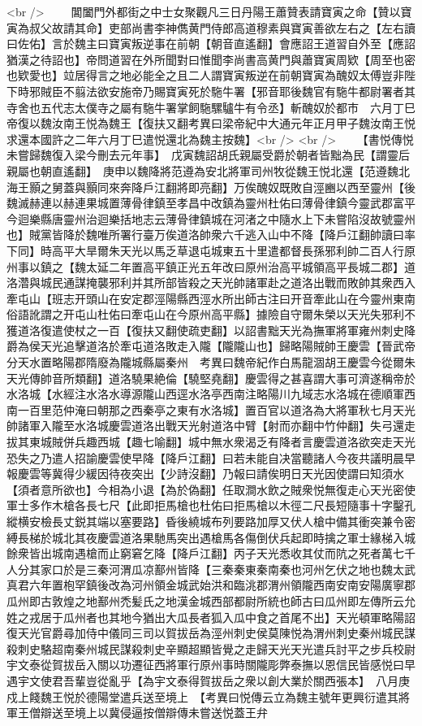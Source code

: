 <br />
　　閶闔門外都街之中士女聚觀凡三日丹陽王蕭贊表請寶寅之命【贊以寶寅為叔父故請其命】吏部尚書李神儁黄門侍郎高道穆素與寶寅善欲左右之【左右讀曰佐佑】言於魏主曰寶寅叛逆事在前朝【朝音直遙翻】會應詔王道習自外至【應詔猶漢之待詔也】帝問道習在外所聞對曰惟聞李尚書高黄門與蕭寶寅周欵【周至也密也欵愛也】竝居得言之地必能全之且二人謂寶寅叛逆在前朝寶寅為醜奴太傅豈非陛下時邪賊臣不翦法欲安施帝乃賜寶寅死於駞牛署【邪音耶後魏官有駞牛都尉署者其寺舍也五代志太僕寺之屬有駞牛署掌飼駞騾驢牛有令丞】斬醜奴於都市　六月丁巳帝復以魏汝南王悦為魏王【復扶又翻考異曰梁帝紀中大通元年正月甲子魏汝南王悦求還本國許之二年六月丁巳遣悦還北為魏主按魏】<br />
<br />
　　【書悦傳悦未嘗歸魏復入梁今刪去元年事】　戊寅魏詔胡氏親屬受爵於朝者皆黜為民【謂靈后親屬也朝直遙翻】　庚申以魏降將范遵為安北將軍司州牧從魏王悦北還【范遵魏北海王顥之舅蓋與顥同來奔降戶江翻將即亮翻】万俟醜奴既敗自涇豳以西至靈州【後魏滅赫連以赫連果城置薄骨律鎮至孝昌中改鎮為靈州杜佑曰薄骨律鎮今靈武郡富平今迴樂縣唐靈州治迴樂括地志云薄骨律鎮城在河渚之中隨水上下未嘗陷沒故號靈州也】賊黨皆降於魏唯所署行臺万俟道洛帥衆六千逃入山中不降【降戶江翻帥讀曰率下同】時高平大旱爾朱天光以馬乏草退屯城東五十里遣都督長孫邪利帥二百人行原州事以鎮之【魏太延二年置高平鎮正光五年改曰原州治高平城領高平長城二郡】道洛濳與城民通謀掩襲邪利并其所部皆殺之天光帥諸軍赴之道洛出戰而敗帥其衆西入牽屯山【班志开頭山在安定郡涇陽縣西涇水所出師古注曰开音牽此山在今靈州東南俗語訛謂之开屯山杜佑曰牽屯山在今原州高平縣】據險自守爾朱榮以天光失邪利不獲道洛復遣使杖之一百【復扶又翻使疏吏翻】以詔書黜天光為撫軍將軍雍州刺史降爵為侯天光追擊道洛於牽屯道洛敗走入隴【隴隴山也】歸略陽賊帥王慶雲【晉武帝分天水置略陽郡隋廢為隴城縣屬秦州　考異曰魏帝紀作白馬龍涸胡王慶雲今從爾朱天光傳帥音所類翻】道洛驍果絶倫【驍堅堯翻】慶雲得之甚喜謂大事可濟遂稱帝於水洛城【水經注水洛水導源隴山西逕水洛亭西南注略陽川九域志水洛城在德順軍西南一百里范仲淹曰朝那之西秦亭之東有水洛城】置百官以道洛為大將軍秋七月天光帥諸軍入隴至水洛城慶雲道洛出戰天光射道洛中臂【射而亦翻中竹仲翻】失弓還走拔其東城賊併兵趣西城【趣七喻翻】城中無水衆渴乏有降者言慶雲道洛欲突走天光恐失之乃遣人招諭慶雲使早降【降戶江翻】曰若未能自决當聽諸人今夜共議明晨早報慶雲等冀得少緩因待夜突出【少詩沒翻】乃報曰請俟明日天光因使謂曰知須水【須者意所欲也】今相為小退【為於偽翻】任取澗水飲之賊衆悦無復走心天光密使軍士多作木槍各長七尺【此即拒馬槍也杜佑曰拒馬槍以木徑二尺長短隨事十字鑿孔縱横安檢長丈鋭其端以塞要路】昏後繞城布列要路加厚又伏人槍中備其衝突兼令密縛長梯於城北其夜慶雲道洛果馳馬突出遇槍馬各傷倒伏兵起即時擒之軍士緣梯入城餘衆皆出城南遇槍而止窮窘乞降【降戶江翻】丙子天光悉收其仗而阬之死者萬七千人分其家口於是三秦河渭瓜凉鄯州皆降【三秦秦東秦南秦也河州乞伏之地也魏太武真君六年置枹罕鎮後改為河州領金城武始洪和臨洮郡渭州領隴西南安南安陽廣寧郡瓜州即古敦煌之地鄯州禿髪氏之地漢金城西部都尉所統也師古曰瓜州即左傳所云允姓之戎居于瓜州者也其地今猶出大瓜長者狐入瓜中食之首尾不出】天光頓軍略陽詔復天光官爵尋加侍中儀同三司以賀拔岳為涇州刺史侯莫陳悦為渭州刺史秦州城民謀殺刺史駱超南秦州城民謀殺刺史辛顯超顯皆覺之走歸天光天光遣兵討平之步兵校尉宇文泰從賀拔岳入關以功遷征西將軍行原州事時關隴彫弊泰撫以恩信民皆感悦曰早遇宇文使君吾輩豈從亂乎【為宇文泰得賀拔岳之衆以創大業於關西張本】　八月庚戍上餞魏王悦於德陽堂遣兵送至境上　【考異曰悦傳云立為魏主號年更興衍遣其將軍王僧辯送至境上以冀侵逼按僧辯傳未嘗送悦蓋王弁
